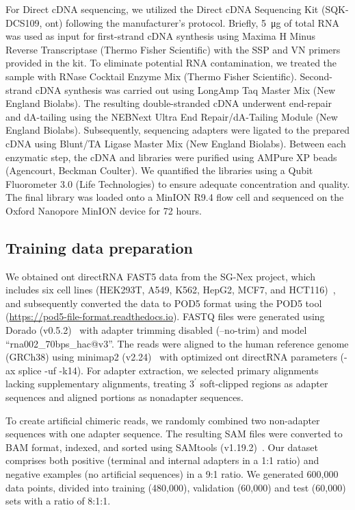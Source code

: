 \documentclass[pdflatex,sn-nature, lineno]{sn-jnl}%
\theoremstyle{thmstyleone}%
\theoremstyle{thmstyletwo}%
\theoremstyle{thmstylethree}%
\begin{document}
For Direct cDNA sequencing, we utilized the Direct cDNA Sequencing Kit (SQK-DCS109, \gls{ont}) following the manufacturer's protocol.
Briefly, \SI{5}{\micro\gram}  of total RNA was used as input for first-strand cDNA synthesis using Maxima H Minus Reverse Transcriptase (Thermo Fisher Scientific) with the SSP and VN primers provided in the kit.
To eliminate potential RNA contamination, we treated the sample with RNase Cocktail Enzyme Mix (Thermo Fisher Scientific).
Second-strand cDNA synthesis was carried out using LongAmp Taq Master Mix (New England Biolabs).
The resulting double-stranded cDNA underwent end-repair and dA-tailing using the NEBNext Ultra End Repair/dA-Tailing Module (New England Biolabs).
Subsequently, sequencing adapters were ligated to the prepared cDNA using Blunt/TA Ligase Master Mix (New England Biolabs).
Between each enzymatic step, the cDNA and libraries were purified using AMPure XP beads (Agencourt, Beckman Coulter).
We quantified the libraries using a Qubit Fluorometer 3.0 (Life Technologies) to ensure adequate concentration and quality.
The final library was loaded onto a MinION R9.4 flow cell and sequenced on the Oxford Nanopore MinION device for 72 hours.

\subsection{Training data preparation}\label{ssec:data}

We obtained \gls{ont} directRNA FAST5 data from the SG-Nex project, which includes six cell lines (HEK293T, A549, K562, HepG2, MCF7, and HCT116)~\cite{chen2021systematic}, and subsequently converted the data to POD5 format using the POD5 tool (\url{https://pod5-file-format.readthedocs.io}).
FASTQ files were generated using Dorado (v0.5.2)~\cite{dorado2023} with adapter trimming disabled (--no-trim) and  model ``rna002\_70bps\_hac@v3''.
The reads were aligned to the human reference genome (GRCh38) using minimap2 (v2.24)~\cite{li2018minimap2} with optimized \gls{ont} directRNA parameters (-ax splice -uf -k14).
For adapter extraction, we selected primary alignments lacking supplementary alignments, treating \(3^{\prime}\)  soft-clipped regions as adapter sequences and aligned portions as nonadapter sequences.

To create artificial chimeric reads, we randomly combined two non-adapter sequences with one adapter sequence.
The resulting SAM files were converted to BAM format, indexed, and sorted using SAMtools (v1.19.2)~\cite{li2009sequence}.
Our dataset comprises both positive (terminal and internal adapters in a 1:1 ratio) and negative examples (no artificial sequences) in a 9:1 ratio.
We generated 600,000 data points, divided into training (480,000), validation (60,000) and test (60,000) sets with a ratio of 8:1:1.
\end{document}
